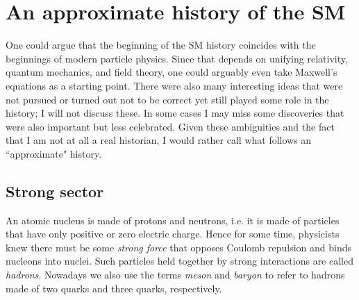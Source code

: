 \section{An approximate history of the SM}


One could argue that the beginning of the SM history coincides with the
beginnings of modern particle physics. Since that depends on unifying
relativity, quantum mechanics, and field theory, one could arguably even take
Maxwell's equations as a starting point. 
There were also many interesting ideas that were not pursued or turned out
not to be correct yet still played some role in the history; I will not
discuss these. In some cases I may miss some discoveries that were also
important but less celebrated.
Given these ambiguities and the fact
that I am not at all a real historian, 
I would rather call what follows an ``approximate" history.

\subsection{Strong sector}

An atomic nucleus is made of protons and neutrons, i.e. it is made of particles
that have only positive or zero electric charge. Hence for some time, physicists
knew there must be some {\it strong force} that opposes
Coulomb repulsion and binds nucleons into nuclei.
Such particles held together by strong interactions are called
{\it hadrons}. Nowadays we also use the terms {\it meson}
 and {\it baryon} to refer to hadrons made of 
two quarks and three quarks, respectively.


